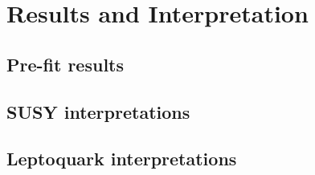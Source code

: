 \chapter{Results and Interpretation}

\section{Pre-fit results}

\section{SUSY interpretations}

\section{Leptoquark interpretations}
